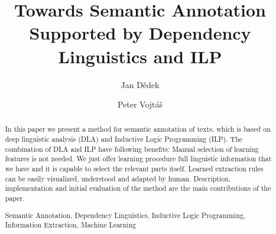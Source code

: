 \documentclass[runningheads,a4paper]{llncs}
\newcommand{\keywords}[1]{\par\addvspace\baselineskip
\noindent\keywordname\enspace\ignorespaces#1}
\begin{document}
\mainmatter  %

\title{Towards Semantic Annotation Supported by Dependency Linguistics and ILP}


%
%
\author{Jan D\v{e}dek
\and Peter Vojt\'{a}\v{s}}
%


%
%

\maketitle


\begin{abstract}
In this paper we present a method for semantic annotation of texts, which is based on deep linguistic analysis (DLA) and Inductive Logic Programming (ILP). The combination of DLA and ILP have following benefits: Manual selection of learning features is not needed. We just offer learning procedure full linguistic information that we have and it is capable to select the relevant parts itself. Learned extraction rules can be easily visualized, understood and adapted by human.
Description, implementation and initial evaluation of the method are the main contributions of the paper.
\keywords{Semantic Annotation, Dependency Linguistics, Inductive Logic Programming, Information Extraction, Machine Learning}
\end{abstract}
\end{document}
